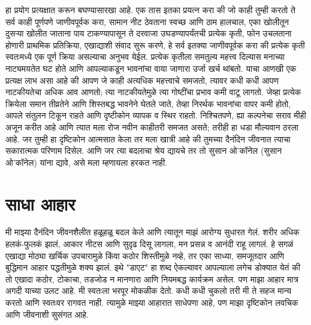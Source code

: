 हा प्रयोग प्रत्यक्षात करून बघण्यासारखा आहे. एक तास इतका प्रयत्न करा की जो काही तुम्ही करतो ते सर्व काही पूर्णपणे जाणीवपूर्वक करा, सामान नीट ठेवताना स्वच्छ आणि ठाम हालचाल, एका खोलीतून दुसऱ्या खोलीत जाताना पाय टाकण्यापासून ते दरवाजा उघडण्यापर्यंतची प्रत्येक कृती, फोन उचलताना होणारी प्राथमिक प्रतिक्रिया, एखाद्याशी संवाद सुरू करणे, हे सर्व इतक्या जाणीवपूर्वक करा की प्रत्येक कृती स्वतःमध्ये एक पूर्ण क्रिया असल्याचा अनुभव येईल. प्रत्येक कृतीला समतुल्य महत्त्व दिल्यास मनाच्या नाट्यमयतेत घट होते आणि आपल्याकडून भावनांचा वाया जाणारा उर्जा खर्च थांबतो.
याचा आणखी एक प्रत्यक्ष लाभ असा आहे की आपण जे काही अत्यधिक महत्त्वाचे समजतो, त्यावर कधी कधी आपण नाटकीयतेचा अधिक आव आणतो; त्या नाटकीयतेमुळे त्या गोष्टींचा प्रभाव कमी वाटू लागतो. जेव्हा प्रत्येक क्रियेला समान तीव्रतेने आणि शिस्तबद्ध भावनेने घेतले जाते, तेव्हा निरर्थक भावनांचा वापर कमी होतो, आपले संतुलन टिकून राहते आणि दृष्टीकोन व्यापक व स्थिर राहतो.
निश्चितपणे, ह्या कल्पनेचा सराव मीही अजून करीत आहे आणि त्यात मला रोज नवीन काहीतरी समजत असते; तरीही हा धडा मौल्यवान ठरला आहे. जर तुम्ही हा दृष्टिकोन आत्मसात केला तर मला खात्री आहे की तुमच्या दैनंदिन जीवनात त्याचा सकारात्मक परिणाम दिसेल. आणि जर त्या बदलाचा श्रेय द्यायचे तर तो सुसान ओ’कॉनेल (सुसान ओ’कॉनेल) यांना द्यावे, असे मला म्हणायला हरकत नाही.

 \chapter{साधा आहार}
मी माझ्या दैनंदिन जीवनशैलीत हळूहळू बदल केले आणि त्यातून माझं आरोग्य सुधारत गेलं. शरीर अधिक हलकं-फुलकं झालं, आकार नीटस आणि सुदृढ दिसू लागला, मन प्रसन्न व आनंदी राहू लागलं. हे सगळं एखाद्या मोठ्या खर्चिक उपचारामुळे किंवा कठोर शिस्तीमुळे नव्हे, तर एका साध्या, समजूतदार आणि बुद्धिमान आहार पद्धतीमुळे शक्य झालं. 
इथे "डाएट" हा शब्द ऐकल्यावर आपल्याला लगेच डोक्यात येतं की तो एखादा कठोर, टोकाचा, तडजोड न मानणारा आणि नियमबद्ध कार्यक्रम असेल. पण माझा आहार मात्र अगदी याच्या उलट आहे. मी स्वतःला भरपूर मोकळीक देतो. कधी कधी चुकलो तरी मी ते सहज मान्य करतो आणि स्वतःवर रागवत नाही. त्यामुळे माझ्या आहारात साधेपणा आहे, पण माझा दृष्टिकोन लवचिक आणि जीवनाशी सुसंगत आहे.
